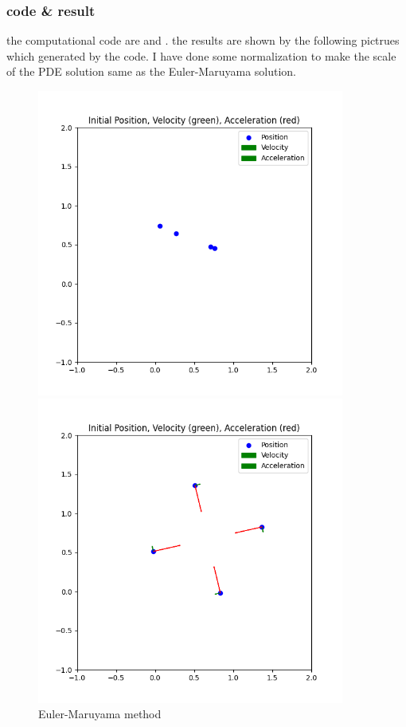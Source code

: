 \documentclass{article}
\theoremstyle{definition} %
\begin{document}
\subsubsection{code \& result}
the computational code are \cite[Euler-Maruyama]{HEAT-EM} and \cite[PDE]{HEAT-PDE}.
the results are shown by the following pictrues which
generated by the code.
I have done some normalization to make the scale of
the PDE solution same as the Euler-Maruyama solution.
\begin{figure}[ht!]
    \centering
    \begin{minipage}{0.45\textwidth}
        \centering
        \includegraphics[width=0.9\textwidth]{fig/sample1/dd.png} %
        \caption{Euler-Maruyama method}
        \label{fig:fig4}
    \end{minipage}\hfill
    \begin{minipage}{0.45\textwidth}
        \centering
        \includegraphics[width=0.9\textwidth]{fig/sample1/dd_18254.png} %

\end{minipage}
\end{figure}
\end{document}
